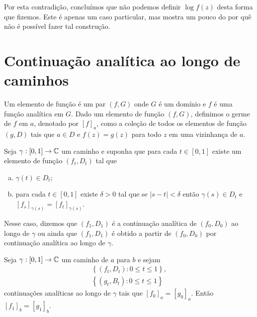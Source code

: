 Por esta contradição, concluímos que não podemos definir $\log f(z)$ desta forma que fizemos.
Este é apenas um caso particular, mas mostra um pouco do por quê não é possível fazer tal
construção.

\section{Continuação analítica ao longo de caminhos}


    \begin{definicao}
        \label{def-elemento-funcao}
        Um elemento de função é um par $(f, G)$ onde $G$ é um domínio e $f$
        é uma função analítica em $G$. Dado um elemento de função $(f,G)$, 
        definimos o germe de $f$ em $a$, denotado por $[f]_a$, 
        como a coleção de todos os elementos de função $(g,D)$ tais que 
        $a\in D$ e $f(z) = g(z)$ para todo $z$ em uma vizinhança de $a$.
    \end{definicao}


    \begin{definicao}
    \label{def-continuacao-analitica}
        Seja $\gamma: [0,1] \to \mathbb{C}$ um caminho e suponha que para cada
        $t\in[0,1]$ existe um elemento de função $(f_t, D_t)$ tal que
        \begin{enumerate}[(a)]
            \item $\gamma(t) \in D_t$;
            \item para cada $t\in[0,1]$ existe $\delta > 0$ tal que se $|s-t| < \delta$
            então $\gamma(s) \in D_t$ e $[f_s]_{\gamma(s)} = [f_t]_{\gamma(s)}$.
        \end{enumerate}
        Nesse caso, dizemos que $(f_1, D_1)$ é a continuação analítica de $(f_0,D_0)$ ao 
        longo de $\gamma$ ou ainda que $(f_1, D_1)$ é obtido a partir de $(f_0,D_0)$ por
        continuação analítica ao longo de $\gamma$.
    \end{definicao}


    \begin{proposicao}
    \label{prop-unicidade-continuacao-analitica-caminho}
        Seja $\gamma: [0,1]\to\mathbb{C}$ um caminho de $a$ para $b$ e sejam
        \begin{align*}
            \left\{ (f_t, D_t): 0\leq t\leq 1 \right\}, \\
            \left\{ (g_t, B_t): 0\leq t\leq 1 \right\}
        \end{align*}
        continuações analíticas ao longo de $\gamma$ tais que $[f_0]_a = [g_0]_a$.
        Então $[f_1]_b = [g_1]_b$.
    \end{proposicao}

